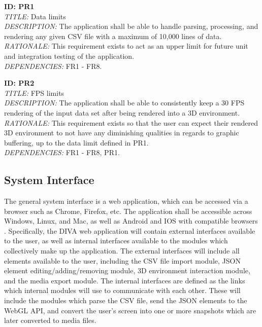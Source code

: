 \documentclass[journal,10pt,onecolumn,compsoc]{IEEEtran} \usepackage[margin=1.0in]{geometry} \usepackage{pdfpages}
\begin{document}
    \noindent \textbf{ID: PR1}\\
    \textit{TITLE:} Data limits\\
    \textit{DESCRIPTION:} The application shall be able to handle parsing, processing, and rendering any given CSV file with a maximum of 10,000 lines of data. \\
    \textit{RATIONALE:} This requirement exists to act as an upper limit for future unit and integration testing of the application. \\
    \textit{DEPENDENCIES:} FR1 - FR8.
    \newline
    
    \noindent \textbf{ID: PR2}\\
    \textit{TITLE:} FPS limits\\
    \textit{DESCRIPTION:} The application shall be able to consistently keep a 30 FPS rendering of the input data set after being rendered into a 3D environment.\\
    \textit{RATIONALE:} This requirement exists so that the user can expect their rendered 3D environment to not have any diminishing qualities in regards to graphic buffering, up to the data limit defined in PR1.\\
    \textit{DEPENDENCIES:} FR1 - FR8, PR1.

    \subsection{System Interface}
    \noindent The general system interface is a web application, which can be accessed via a browser such as Chrome, Firefox, etc. The application shall be accessible across Windows, Linux, and Mac, as well as Android and IOS with compatible browsers \cite{WebGL}. \newline
    \noindent Specifically, the DIVA web application will contain external interfaces available to the user, as well as internal interfaces available to the modules which collectively make up the application. The external interfaces will include all elements available to the user, including the CSV file import module, JSON element editing/adding/removing module, 3D environment interaction module, and the media export module. The internal interfaces are defined as the links which internal modules will use to communicate with each other. These will include the modules which parse the CSV file, send the JSON elements to the WebGL API, and convert the user's screen into one or more snapshots which are later converted to media files.
 
\end{document}
